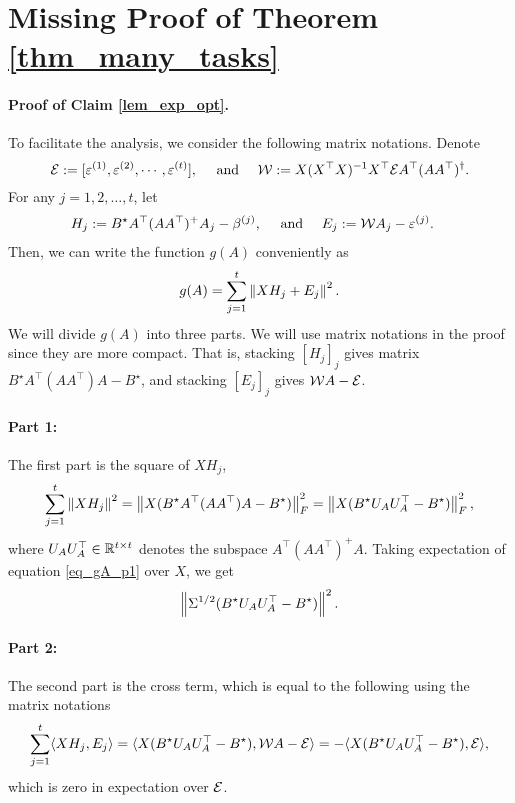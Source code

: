 \section{Missing Proof of Theorem \ref{thm_many_tasks}}\label{app_proof_error_same_cov}

	\paragraph{Proof of Claim \ref{lem_exp_opt}.}
	To facilitate the analysis, we consider the following matrix notations.
	Denote
\[\mathcal{E}  :=[\varepsilon^{(1)},\varepsilon^{(2)},\cdots, \varepsilon^{(t)}],  \quad \text{ and } \quad {\mathcal W} := X(X^{\top} X)^{-1} X^{\top} \mathcal{E} A^{\top} (AA^{\top})^{\dag}. \]
	For any $j = 1,2,\dots, t$, let
	\begin{align*}
		H_j &:= B^{\star} A^{\top} (AA^{\top})^{+} A_j - \beta^{(j)}, \quad \text{ and } \quad E_j := {\mathcal W} A_j - \varepsilon^{(j)}.
	\end{align*}
	Then, we can write the function $g(A)$ conveniently as
	\[ g(A) = \sum_{j=1}^t \left\| X H_j + E_j \right\|^2. \]
	We will divide $g(A)$ into three parts.
	We will use matrix notations in the proof since they are more compact.
	That is, stacking $[H_j]_j$ gives matrix $B^{\star} A^{\top} (AA^{\top}) A - B^{\star}$,
	and stacking $[E_j]_j$ gives ${\mathcal W} A - \mathcal{E}$.

	\paragraph{Part 1:} The first part is the square of $XH_j$,
	\begin{align}\label{eq_gA_p1}
		\sum_{j=1}^t \left\| X H_j \right\|^2
		= \left\| X (B^{\star} A^{\top} (AA^{\top}) A - B^{\star}) \right\|_{F}^2
		= \left\| X (B^{\star} U_A U_A^{\top} - B^{\star}) \right\|_{F}^2,
	\end{align}
	where $U_{A} U_{A}^{\top} \in\mathbb{R}^{t\times t}$ denotes the subspace $ {A}^{\top} ( {A}{A}^{\top})^{+}  {A}$.
	Taking expectation of equation \eqref{eq_gA_p1} over $X$, we get
		\[ \left\| \Sigma^{1/2}(B^{\star} U_A U_A^{\top} - B^{\star}) \right\|^2. \]

	\paragraph{Part 2:} The second part is the cross term, which is equal to the following using the matrix notations
	\begin{align}\label{eq_gA_p2}
		\sum_{j=1}^t\langle XH_j, E_j \rangle = \langle X(B^{\star} U_A U_A^{\top} - B^{\star}), {\mathcal W} A - \mathcal{E} \rangle
		= - \langle X (B^{\star} U_A U_A^{\top} - B^{\star}), \mathcal{E} \rangle,
	\end{align}
	which is zero in expectation over $\mathcal{E}$.


